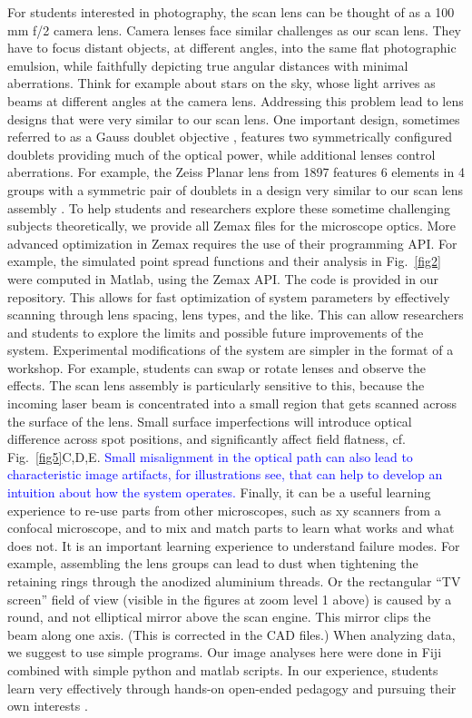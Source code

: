 \documentclass[10pt,letterpaper]{article}
\begin{document}
For students interested in photography, the scan lens can be thought of as a 100 mm f/2 camera lens. Camera lenses face similar challenges as our scan lens. They have to focus distant objects, at different angles, into the same flat photographic emulsion, while faithfully depicting true angular distances with minimal aberrations. Think for example about stars on the sky, whose light arrives as beams at different angles at the camera lens. Addressing this problem lead to lens designs that were very similar to our scan lens. One important design, sometimes referred to as a Gauss doublet objective \cite{Kidger2001}, features two symmetrically configured doublets providing much of the optical power, while additional lenses control aberrations. For example, the Zeiss Planar lens from 1897 features 6 elements in 4 groups with a symmetric pair of doublets in a design very similar to our scan lens assembly \cite{Rudolf1897}. To help students and researchers explore these sometime challenging subjects theoretically, we provide all Zemax files for the microscope optics. More advanced optimization in Zemax requires the use of their programming API. For example, the simulated point spread functions and their analysis in Fig.~\ref{fig2} were computed in Matlab, using the Zemax API. The code is provided in our repository. This allows for fast optimization of system parameters by effectively scanning through lens spacing, lens types, and the like. This can allow researchers and students to explore the limits and possible future improvements of the system. Experimental modifications of the system are simpler in the format of a workshop. For example, students can swap or rotate lenses and observe the effects. The scan lens assembly is particularly sensitive to this, because the incoming laser beam is concentrated into a small region that gets scanned across the surface of the lens. Small surface imperfections will introduce optical difference across spot positions, and significantly affect field flatness, cf. Fig.~\ref{fig5}C,D,E. \textcolor{blue}{Small misalignment in the optical path can also lead to characteristic image artifacts, for illustrations see\cite{Corbett2014, Lees2024}, that can help to develop an intuition about how the system operates.}\newline
Finally, it can be a useful learning experience to re-use parts from other microscopes, such as xy scanners from a confocal microscope\cite{Nikolenko2013}, and to mix and match parts to learn what works and what does not. It is an important learning experience to understand failure modes. For example, assembling the lens groups can lead to dust when tightening the retaining rings through the anodized aluminium threads. Or the rectangular ``TV screen'' field of view (visible in the figures at zoom level 1 above) is caused by a round, and not elliptical mirror above the scan engine. This mirror clips the beam along one axis. (This is corrected in the CAD files.) When analyzing data, we suggest to use simple programs. Our image analyses here were done in Fiji \cite{Schindelin2019} combined with simple python and matlab scripts. In our experience, students learn very effectively through hands-on open-ended pedagogy and pursuing their own interests \cite{Zajdel2016}.\newline
\end{document}
